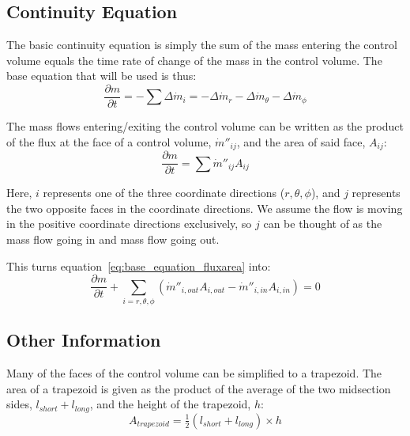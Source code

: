 \documentclass[12pt, letterpaper, twoside]{article}
\begin{document}
\subsection{Continuity Equation}
    The basic continuity equation is simply the sum of the mass entering the control volume equals the time rate of change of the mass in the control volume. The base equation that will be used is thus:
    \begin{equation}\label{eq:base_equation_orig}
        \frac{\partial m}{\partial t} = - \sum \Delta\dot{m}_i = -\Delta\dot{m}_r - \Delta\dot{m}_{\theta} - \Delta\dot{m}_{\phi} 
    \end{equation}

    The mass flows entering/exiting the control volume can be written as the product of the flux at the face of a control volume, \(\dot{m}''_{ij}\), and the area of said face, \(A_{ij}\):
    \begin{equation}\label{eq:base_equation_fluxarea}
        \frac{\partial m}{\partial t} = \sum \dot{m}''_{ij} A_{ij}
    \end{equation}

    Here, \(i\) represents one of the three coordinate directions (\(r, \theta, \phi\)), and \(j\) represents the two opposite faces in the coordinate directions. We assume the flow is moving in the positive coordinate directions exclusively, so \(j\) can be thought of as the mass flow going in and mass flow going out.

    This turns equation~\ref{eq:base_equation_fluxarea} into:
    \begin{equation}\label{eq:base_equation_full}
        \frac{\partial m}{\partial t} + 
        \sum_{i=r, \theta, \phi}
        (\dot{m}''_{i,out} A_{i,out} - \dot{m}''_{i,in} A_{i,in}) = 0 
    \end{equation}


\subsection{Other Information}\label{sect:otherinfo}
Many of the faces of the control volume can be simplified to a trapezoid. The area of a trapezoid is given as the product of the average of the two midsection sides, \(l_{short} + l_{long}\), and the height of the trapezoid, \(h\):
%
\begin{equation}\label{eq:traparea}
    A_{trapezoid} = \tfrac{1}{2} (l_{short} + l_{long}) \times h
\end{equation}
\end{document}
